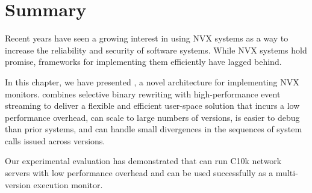 \section{Summary}
\label{efficient-execution:summary}

Recent years have seen a growing interest in using NVX systems as a way to
increase the reliability and security of software systems.  While NVX systems
hold promise, frameworks for implementing them efficiently have lagged behind.

In this chapter, we have presented \varan, a novel architecture for
implementing NVX monitors. \varan combines selective binary rewriting with
high-performance event streaming to deliver a flexible and efficient user-space
solution that incurs a low performance overhead, can scale to large numbers of
versions, is easier to debug than prior systems, and can handle small
divergences in the sequences of system calls issued across versions.

Our experimental evaluation has demonstrated that \varan can run C10k network
servers with low performance overhead and can be used successfully as a
multi-version execution monitor.
